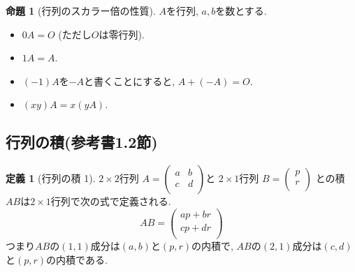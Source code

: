 \documentclass[dvipdfmx,a4paper,11pt]{article}
\theoremstyle{definition}
\newtheorem{prop}[thm]{命題}
\newtheorem{dfn}[thm]{定義}
\begin{document}
 
 
 
 \begin{tcolorbox}[
    colback = white,
    colframe = green!35!black,
    fonttitle = \bfseries,
    breakable = true]
    \begin{prop}[行列のスカラー倍の性質]
$A$を行列, $a,b$を数とする.
 \begin{itemize}
 	\setlength{\parskip}{0cm}
  	\setlength{\itemsep}{0pt} 
 \item $0A =O$ (ただし$O$は零行列).
  \item $1A=A$. 
  \item $(-1)A$を$-A$と書くことにすると, $A + (-A) =O$.　
  \item $(xy) A = x(yA)$.
 \end{itemize}
  \end{prop}
 \end{tcolorbox}
 
 \subsection{行列の積(参考書1.2節)}
 
  \begin{tcolorbox}[
    colback = white,
    colframe = green!35!black,
    fonttitle = \bfseries,
    breakable = true]
    \begin{dfn}[行列の積 1]
    
$2 \times 2$行列
$
A=\begin{pmatrix}
a& b \\
c& d \\
\end{pmatrix}
$と 
$2 \times 1$行列
$
B=
\begin{pmatrix}
p \\
r\\
\end{pmatrix}
$
との積$AB$は$2 \times 1$行列で次の式で定義される.
$$
AB =
\begin{pmatrix}
ap + br \\
cp + dr\\
\end{pmatrix}
$$
つまり$AB$の$(1,1)$成分は$(a,b)$と$(p,r)$の内積で, $AB$の$(2,1)$成分は$(c,d)$と$(p,r)$の内積である. 
  \end{dfn}
 \end{tcolorbox}
 
\end{document}
